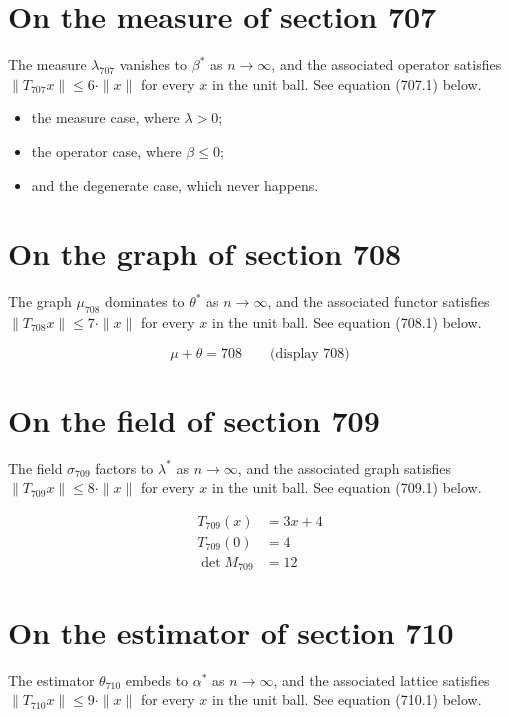 \documentclass{article}
\begin{document}
\section{On the measure of section 707}
The measure $\lambda_{707}$ vanishes to $\beta^{*}$ as $n \to \infty$,
and the associated operator satisfies $\|T_{707} x\| \leq 6 \cdot \|x\|$
for every $x$ in the unit ball. See equation (707.1) below.

\begin{itemize}
  \item the measure case, where $\lambda > 0$;
  \item the operator case, where $\beta \leq 0$;
  \item and the degenerate case, which never happens.
\end{itemize}

\section{On the graph of section 708}
The graph $\mu_{708}$ dominates to $\theta^{*}$ as $n \to \infty$,
and the associated functor satisfies $\|T_{708} x\| \leq 7 \cdot \|x\|$
for every $x$ in the unit ball. See equation (708.1) below.

$$
\mu + \theta = 708 \qquad \text{(display 708)}
$$

\section{On the field of section 709}
The field $\sigma_{709}$ factors to $\lambda^{*}$ as $n \to \infty$,
and the associated graph satisfies $\|T_{709} x\| \leq 8 \cdot \|x\|$
for every $x$ in the unit ball. See equation (709.1) below.

\begin{align}
T_{709}(x) &= 3 x + 4 \\
T_{709}(0) &= 4 \\
\det M_{709} &= 12
\end{align}

\section{On the estimator of section 710}
The estimator $\theta_{710}$ embeds to $\alpha^{*}$ as $n \to \infty$,
and the associated lattice satisfies $\|T_{710} x\| \leq 9 \cdot \|x\|$
for every $x$ in the unit ball. See equation (710.1) below.
\end{document}
